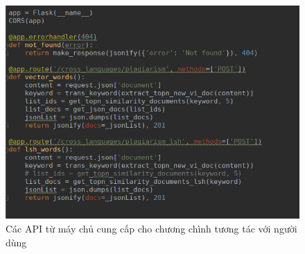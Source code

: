 \documentclass[12pt]{report}
\begin{document}
\begin{figure}[h]
	\centering
	\includegraphics[scale=0.7]{api}
	\caption{Các API từ máy chủ cung cấp cho chương chình tương tác với người dùng}
\end{figure}
\end{document}
